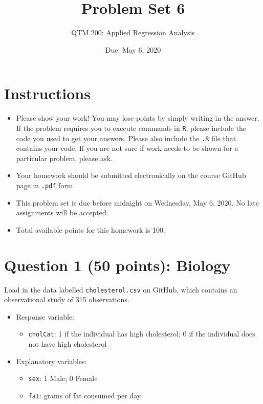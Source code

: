 \documentclass[12pt,letterpaper]{article}
\title{Problem Set 6}
\date{Due: May 6, 2020}
\author{QTM 200: Applied Regression Analysis}
\begin{document}
	\maketitle
	
	\section*{Instructions}
	\begin{itemize}
		\item Please show your work! You may lose points by simply writing in the answer. If the problem requires you to execute commands in \texttt{R}, please include the code you used to get your answers. Please also include the \texttt{.R} file that contains your code. If you are not sure if work needs to be shown for a particular problem, please ask.
		\item Your homework should be submitted electronically on the course GitHub page in \texttt{.pdf} form.
		\item This problem set is due before midnight on Wednesday, May 6, 2020. No late assignments will be accepted.
		\item Total available points for this homework is 100.
	\end{itemize}
	
	\vspace{.5cm}
\section*{Question 1 (50 points): Biology}
\vspace{.25cm}
\noindent Load in the data labelled \texttt{cholesterol.csv} on GitHub, which contains an observational study of 315 observations.

\begin{itemize}
	\item
	Response variable: 
	\begin{itemize}
		\item \texttt{cholCat}: 1 if the individual has high cholesterol; 0 if the individual does not have high cholesterol
	\end{itemize}
	\item
	Explanatory variables: 
	\begin{itemize}
		\item
		\texttt{sex}: 1 Male; 0 Female
		\item
		\texttt{fat}: grams of fat consumed per day
		
	\end{itemize}
	
\end{itemize}
\end{document}
